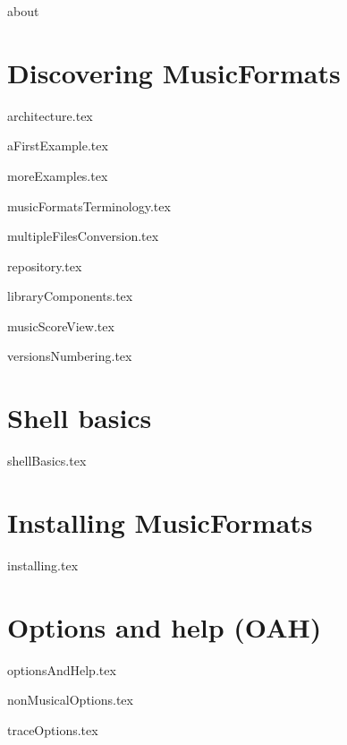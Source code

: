 \documentclass[11pt,a4paper]{report}
\begin{document}
{about}


\part{Discovering MusicFormats}

{architecture.tex}

{aFirstExample.tex}

{moreExamples.tex}

{musicFormatsTerminology.tex}

{multipleFilesConversion.tex}

{repository.tex}

{libraryComponents.tex}

{musicScoreView.tex}

{versionsNumbering.tex}


\part{Shell basics}

{shellBasics.tex}


\part{Installing MusicFormats}

{installing.tex}


\part{Options and help (OAH)}

{optionsAndHelp.tex}

{nonMusicalOptions.tex}

{traceOptions.tex}
\end{document}
